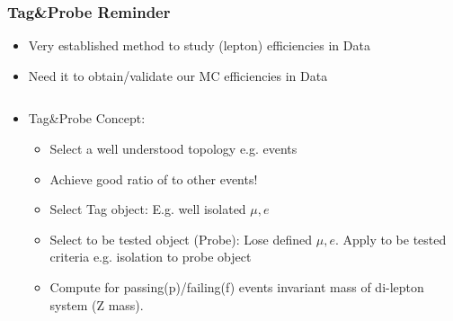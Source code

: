 \documentclass{beamer}
\begin{document}
\begin{frame}
 \frametitle{Tag\&Probe Reminder}
 \begin{itemize}
  \item Very established method to study (lepton) efficiencies in Data
  \item Need it to obtain/validate our MC efficiencies in Data
  \end{itemize}
 
  \begin{columns}
 \begin{column}{0.50\textwidth}
 
   \begin{itemize}

  \item Tag\&Probe Concept:
  \begin{itemize}
   \item Select a well understood topology e.g. \Zll events
   \item Achieve good ratio of \Zll to other events!
   \item Select Tag object: E.g. well isolated $\mu,e$
   \item Select to be tested object (Probe): Lose defined $\mu,e$. Apply to be tested criteria e.g. isolation to probe object
   \item Compute for passing(p)/failing(f) events invariant mass of di-lepton system (Z mass).
  \end{itemize}


\end{itemize}
\end{column}
\end{columns}
\end{frame}
\end{document}
